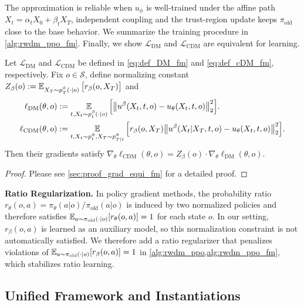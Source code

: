 The approximation is reliable when $u_\phi$ is well-trained under the affine path $X_t=\alpha_t X_0+\beta_t X_T$, independent coupling and the trust-region update keeps $\pi_{\mathrm{old}}$ close to the base behavior.
We summarize the training procedure in \cref{alg:rwdm_ppo_fm}.
Finally, we show $\mathcal{L}_{\mathrm{DM}}$ and $\mathcal{L}_{\mathrm{CDM}}$ are equivalent for learning.

\begin{theorem}
\label{thm:grad_equi_fm}
Let $\mathcal{L}_{\mathrm{DM}}$ and $\mathcal{L}_{\mathrm{CDM}}$ be defined in \eqref{eq:def_DM_fm} and \eqref{eq:def_cDM_fm}, respectively.
Fix $o \in\mathcal S$, define normalizing constant
$Z_{\beta}(o) := \operatorname*{{\mathbb{E}}}_{X_T \sim p_T^\phi(\cdot|o)}\big[r_\beta(o,X_T)\big]$ and
\begin{align*}
    \ell_{\mathrm{DM}}(\theta,o)
    &:=
    \operatorname*{{\mathbb{E}}}_{t, X_t \sim p_t^\beta(\cdot|o)}
    \Big[
        \big\|
            u^\beta(X_t,t,o)
            - u_\theta(X_t,t,o)
        \big\|_2^2
    \Big].
    \\
    \ell_{\mathrm{CDM}}(\theta,o)
    &:=
    \operatorname*{{\mathbb{E}}}_{t, X_t \sim p_t^\phi, X_T \sim p_{T| t}^\phi}
    \Big[
        r_\beta(o,X_T)
        \big\|
            u^\beta(X_t| X_T,t,o)
            - u_\theta(X_t,t,o)
        \big\|_2^2
    \Big].
\end{align*}
Then their gradients satisfy
$\nabla_\theta \ell_{\mathrm{CDM}}(\theta,o)
    =
    Z_{\beta}(o) \cdot \nabla_\theta \ell_{\mathrm{DM}}(\theta,o)$.
\end{theorem}

\begin{proof}
Please see \cref{sec:proof_grad_equi_fm} for a detailed proof.
\end{proof}

\textbf{Ratio Regularization.}
In policy gradient methods, the probability ratio $r_\theta(o,a)=\pi_\theta(a|o)/\pi_{\mathrm{old}}(a|o)$ is induced by two normalized policies and therefore satisfies
$\operatorname*{{\mathbb{E}}}_{a\sim \pi_{\mathrm{old}}(\cdot|o)}[r_\theta(o,a)]=1$ for each state $o$.
In our setting, $r_\beta(o,a)$ is learned as an auxiliary model, so this normalization constraint is not automatically satisfied.
We therefore add a ratio regularizer that penalizes violations of $\operatorname*{{\mathbb{E}}}_{a\sim \pi_{\mathrm{old}}(\cdot|o)}[r_\beta(o,a)]=1$ in \cref{alg:rwdm_ppo,alg:rwdm_ppo_fm}, which stabilizes ratio learning.

\subsection{Unified Framework and Instantiations}
\label{sec:unified_framework}


